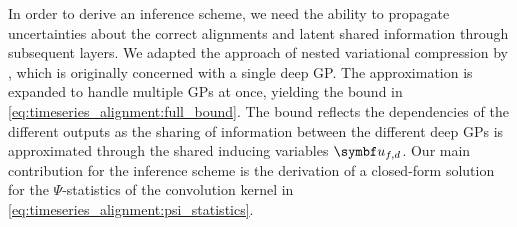 In order to derive an inference scheme, we need the ability to propagate uncertainties about the correct alignments and latent shared information through subsequent layers.
We adapted the approach of nested variational compression by \textcite{hensman_nested_2014}, which is originally concerned with a single deep GP.
The approximation is expanded to handle multiple GPs at once, yielding the bound in \cref{eq:timeseries_alignment:full_bound}.
The bound reflects the dependencies of the different outputs as the sharing of information between the different deep GPs is approximated through the shared inducing variables $\rv{u_{f,d}}$.
Our main contribution for the inference scheme is the derivation of a closed-form solution for the $\Psi$-statistics of the convolution kernel in \cref{eq:timeseries_alignment:psi_statistics}.


